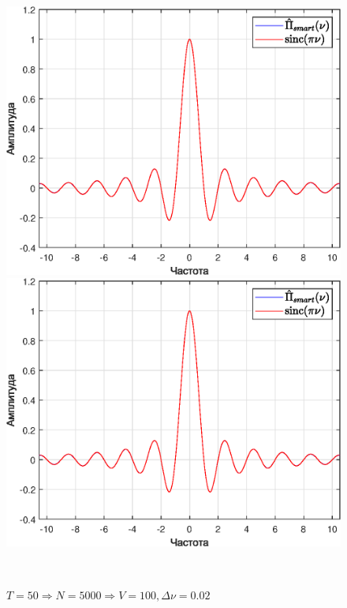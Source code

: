\documentclass[a4paper]{article}
\begin{document}
\begin{figure}[H]
    \begin{minipage}{0.5\textwidth}
        \centering \includegraphics[width=\textwidth]{graphs/3/T_100_dt_0.010001_V_100_dv_0.01/fourier_smart.eps}
        \caption{$T = 1000 \Rightarrow N = 100000 \Rightarrow V = 100, \Delta \nu = 0.01$}
    \end{minipage}\hfill
    \begin{minipage}{0.5\textwidth}
        \centering \includegraphics[width=\textwidth]{graphs/3/T_50_dt_0.010002_V_100_dv_0.02/fourier_smart.eps}
        \caption{$T = 50 \Rightarrow N = 5000 \Rightarrow V = 100, \Delta \nu = 0.02$}
    \end{minipage}\\[1em]
\end{figure}\noindent\
\end{document}
